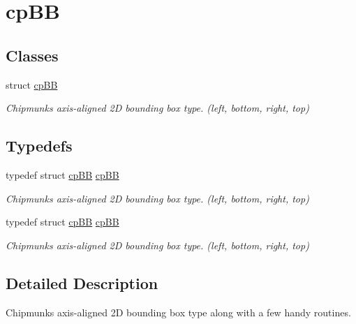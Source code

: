 \hypertarget{group__cpBBB}{}\section{cp\+BB}
\label{group__cpBBB}
\subsection*{Classes}
\begin{DoxyCompactItemize}
\item 
struct \hyperlink{structcpBB}{cp\+BB}
\begin{DoxyCompactList}\small\item\em Chipmunk\textquotesingle{}s axis-\/aligned 2D bounding box type. (left, bottom, right, top) \end{DoxyCompactList}\end{DoxyCompactItemize}
\subsection*{Typedefs}
\begin{DoxyCompactItemize}
\item 
\mbox{\label{group__cpBBB_ga94835b3c44de11eae51d596f39a5fabc}} 
typedef struct \hyperlink{structcpBB}{cp\+BB} \hyperlink{group__cpBBB_ga94835b3c44de11eae51d596f39a5fabc}{cp\+BB}
\begin{DoxyCompactList}\small\item\em Chipmunk\textquotesingle{}s axis-\/aligned 2D bounding box type. (left, bottom, right, top) \end{DoxyCompactList}\item 
\mbox{\label{group__cpBBB_ga94835b3c44de11eae51d596f39a5fabc}} 
typedef struct \hyperlink{structcpBB}{cp\+BB} \hyperlink{group__cpBBB_ga94835b3c44de11eae51d596f39a5fabc}{cp\+BB}
\begin{DoxyCompactList}\small\item\em Chipmunk\textquotesingle{}s axis-\/aligned 2D bounding box type. (left, bottom, right, top) \end{DoxyCompactList}\end{DoxyCompactItemize}


\subsection{Detailed Description}
Chipmunk\textquotesingle{}s axis-\/aligned 2D bounding box type along with a few handy routines. 